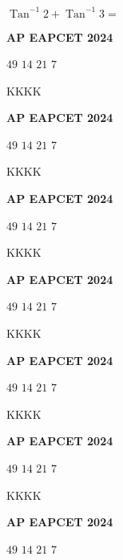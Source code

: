 \documentclass[11pt,paper=a4,answers]{exam}
\begin{document}
\begin{multicols}{2}
\begin{questions}
\question
$\operatorname{Tan}^{-1} 2+\operatorname{Tan}^{-1} 3=$
\begin{flushright}
\small\textbf{AP EAPCET 2024}
\end{flushright}
\begin{choices}
  \choice $49$ 
  \choice $14$ 
  \choice $21$ 
  \choice $7$ 
\end{choices}


\question
KKKK
\begin{flushright}
\small\textbf{AP EAPCET 2024}
\end{flushright}
\begin{choices}
  \choice $49$ 
  \choice $14$ 
  \choice $21$ 
  \choice $7$ 
\end{choices}



\question
KKKK
\begin{flushright}
\small\textbf{AP EAPCET 2024}
\end{flushright}
\begin{choices}
  \choice $49$ 
  \choice $14$ 
  \choice $21$ 
  \choice $7$ 
\end{choices}



\question
KKKK
\begin{flushright}
\small\textbf{AP EAPCET 2024}
\end{flushright}
\begin{choices}
  \choice $49$ 
  \choice $14$ 
  \choice $21$ 
  \choice $7$ 
\end{choices}


\question
KKKK
\begin{flushright}
\small\textbf{AP EAPCET 2024}
\end{flushright}
\begin{choices}
  \choice $49$ 
  \choice $14$ 
  \choice $21$ 
  \choice $7$ 
\end{choices}



\question
KKKK
\begin{flushright}
\small\textbf{AP EAPCET 2024}
\end{flushright}
\begin{choices}
  \choice $49$ 
  \choice $14$ 
  \choice $21$ 
  \choice $7$ 
\end{choices}


\question
KKKK
\begin{flushright}
\small\textbf{AP EAPCET 2024}
\end{flushright}
\begin{choices}
  \choice $49$ 
  \choice $14$ 
  \choice $21$ 
  \choice $7$ 
\end{choices}




\end{questions}
\end{multicols}
\end{document}
